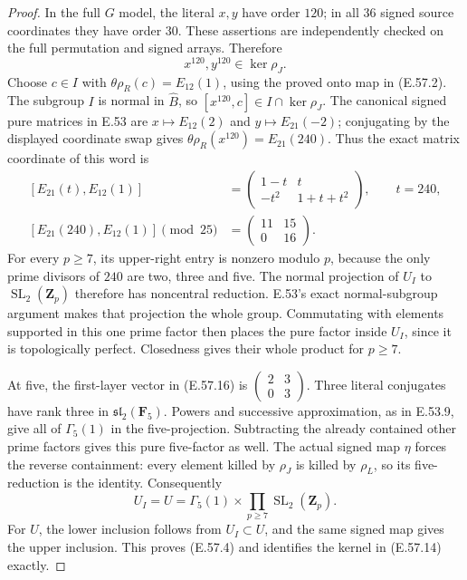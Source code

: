 \begin{proof}
In the full $G$ model, the literal $x,y$ have
order $120$; in all $36$ signed source coordinates
they have order $30$.  These assertions are
independently checked on the full permutation
and signed arrays.  Therefore
\[
                         x^{120},y^{120}\in\ker\rho_J.
 \tag{E.57.15}
\]
Choose $c\in I$ with $\theta\rho_R(c)=E_{12}(1)$,
using the proved onto map in \textup{(E.57.2)}.
The subgroup $I$ is normal in $\widehat B$, so
$[x^{120},c]\in I\cap\ker\rho_J$.
The canonical signed pure matrices in E.53 are
$x\mapsto E_{12}(2)$ and $y\mapsto E_{21}(-2)$;
conjugating by the displayed coordinate swap gives
$\theta\rho_R(x^{120})=E_{21}(240)$.
Thus the exact matrix coordinate of this word is
\[
 \begin{split}
 [E_{21}(t),E_{12}(1)]
       &=\begin{pmatrix}1-t&t\\-t^2&1+t+t^2\end{pmatrix},
                          \qquad t=240,\\
 [E_{21}(240),E_{12}(1)]\pmod{25}
       &=\begin{pmatrix}11&15\\0&16\end{pmatrix}.
 \end{split}
 \tag{E.57.16}
\]
For every $p\ge7$, its upper-right entry is nonzero
modulo $p$, because the only prime divisors of
$240$ are two, three and five.  The normal
projection of $U_I$ to $\operatorname{SL}_2(\mathbf Z_p)$
therefore has noncentral reduction.  E.53's exact
normal-subgroup argument makes that projection
the whole group.  Commutating with elements
supported in this one prime factor then places
the pure factor inside $U_I$, since it is
topologically perfect.  Closedness gives their
whole product for $p\ge7$.

At five, the first-layer vector in
\textup{(E.57.16)} is
$\left(\begin{smallmatrix}2&3\\0&3\end{smallmatrix}\right)$.
Three literal conjugates have rank three in
$\mathfrak{sl}_2(\mathbf F_5)$.  Powers and
successive approximation, as in E.53.9, give
all of $\Gamma_5(1)$ in the five-projection.
Subtracting the already contained other prime
factors gives this pure five-factor as well.
The actual signed map $\eta$ forces the reverse
containment: every element killed by $\rho_J$
is killed by $\rho_L$, so its five-reduction
is the identity.  Consequently
\[
       U_I=U=\Gamma_5(1)\times
                         \prod_{p\ge7}\operatorname{SL}_2(\mathbf Z_p).
 \tag{E.57.17}
\]
For $U$, the lower inclusion follows from $U_I\subset U$,
and the same signed map gives the upper inclusion.
This proves \textup{(E.57.4)} and identifies the
kernel in \textup{(E.57.14)} exactly.


\end{proof}
